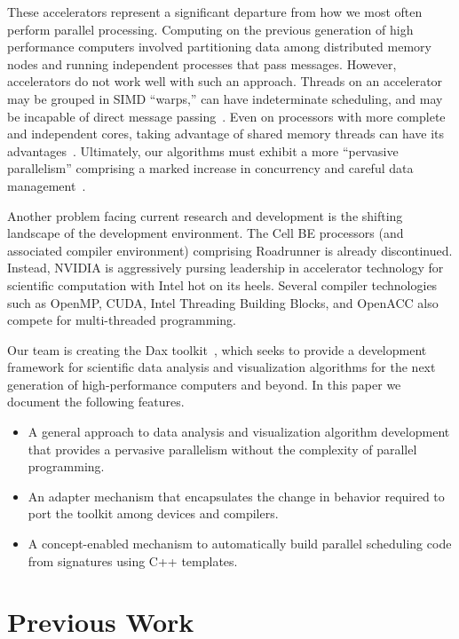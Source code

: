 \documentclass[conference]{IEEEtran}
\newcommand*{\lcite}[1]{~\cite{#1}}
\begin{document}
These accelerators represent a significant departure from how we most often
perform parallel processing.  Computing on the previous generation of high
performance computers involved partitioning data among distributed memory
nodes and running independent processes that pass messages.  However,
accelerators do not work well with such an approach.  Threads on an
accelerator may be grouped in SIMD ``warps,'' can have indeterminate
scheduling, and may be incapable of direct message passing\lcite{Sanders2011}.
Even on processors with more complete and independent cores, taking
advantage of shared memory threads can have its
advantages\lcite{Camp2010,Howison2011}.  Ultimately, our algorithms must
exhibit a more ``pervasive parallelism'' comprising a marked increase in
concurrency and careful data
management\lcite{ScientificDiscoveryExascale2011,ExascaleRoadMap}.

Another problem facing current research and development is the shifting
landscape of the development environment.  The Cell BE processors (and
associated compiler environment) comprising Roadrunner is already
discontinued.  Instead, NVIDIA is aggressively pursing leadership in
accelerator technology for scientific computation with Intel hot on its
heels.  Several compiler technologies such as OpenMP, CUDA, Intel Threading
Building Blocks, and OpenACC also compete for multi-threaded programming.

Our team is creating the Dax toolkit\lcite{Moreland2011:LDAV}, which seeks
to provide a development framework for scientific data analysis and
visualization algorithms for the next generation of high-performance
computers and beyond.  In this paper we document the following features.
\begin{itemize}
\item A general approach to data analysis and visualization algorithm
  development that provides a pervasive parallelism without the complexity
  of parallel programming.
\item An adapter mechanism that encapsulates the change in behavior
  required to port the toolkit among devices and compilers.
\item A concept-enabled mechanism to automatically build parallel
  scheduling code from signatures using C++ templates.
\end{itemize}

\section{Previous Work}
\label{sec:PreviousWork}
\end{document}
